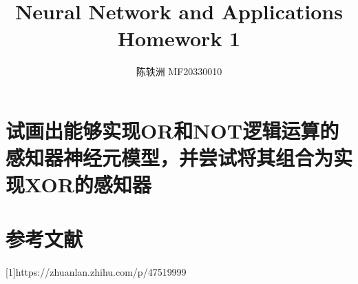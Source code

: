 \documentclass{article}
\title{Neural Network and Applications\\Homework 1}
\author{陈轶洲 MF20330010}
\begin{document}
	\maketitle
\section{试画出能够实现OR和NOT逻辑运算的感知器神经元模型，并尝试将其组合为实现XOR的感知器}
\section{参考文献}
[1]https://zhuanlan.zhihu.com/p/47519999
\end{document}
